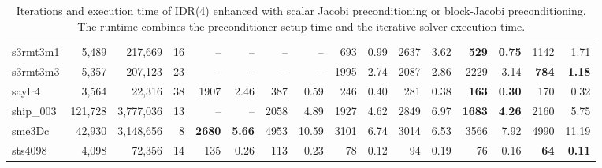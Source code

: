 \begin{landscape}
\begin{table}
\begin{tabular}{lrrr||rr|rr|rr|rr|rr|rr}
              s3rmt3m1  &  5,489  &  217,669  &  16  &       --  &       --   
              &       --  &       --   &      693 &     0.99  &     2637 &     
              3.62  & \textbf{     529} & \textbf{    0.75}  &     1142 &     
              1.71\\
              s3rmt3m3  &  5,357  &  207,123  &  23  &       --  &       --   
              &       --  &       --   &     1995 &     2.74  &     2087 &     
              2.86  &     2229 &     3.14  & \textbf{     784} & \textbf{    
              1.18}\\
                saylr4  &  3,564  &  22,316  &  38  &     1907 &     2.46  
                &      387 &     0.59  &      246 &     0.40  &      281 &     
                0.38  & \textbf{     163} & \textbf{    0.30}  &      170 &     
                0.32\\
              ship\_003  &  121,728  &  3,777,036  &  13  &       --  &       
              --   &     2058 &     4.89  &     1927 &     4.62  &     2849 
              &     6.97  & \textbf{    1683} & \textbf{    4.26}  &     2160 
              &     5.75\\
                sme3Dc  &  42,930  &  3,148,656  &  8  & \textbf{    2680} & 
                \textbf{    5.66}  &     4953 &    10.59  &     3101 &     
                6.74  &     3014 &     6.53  &     3566 &     7.92  &     4990 
                &    11.19\\
               sts4098  &  4,098  &  72,356  &  14  &      135 &     0.26  
               &      113 &     0.23  &       78 &     0.12  &       94 &     
               0.19  &       76 &     0.16  & \textbf{      64} & \textbf{    
               0.11}\\
\hline
\hline
\end{tabular}

\caption{Iterations and execution time of IDR(4) enhanced with scalar Jacobi preconditioning or block-Jacobi preconditioning.\newline
The runtime combines the preconditioner setup time and the iterative solver execution time.}
\label{2017-gje-block-jacobi:tab:idr4comparison}
\end{table}

\end{landscape}
